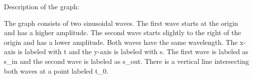 Description of the graph:

The graph consists of two sinusoidal waves. The first wave starts at the origin and has a higher amplitude. The second wave starts slightly to the right of the origin and has a lower amplitude. Both waves have the same wavelength. The x-axis is labeled with t and the y-axis is labeled with s. The first wave is labeled as s_in and the second wave is labeled as s_out. There is a vertical line intersecting both waves at a point labeled t_0.